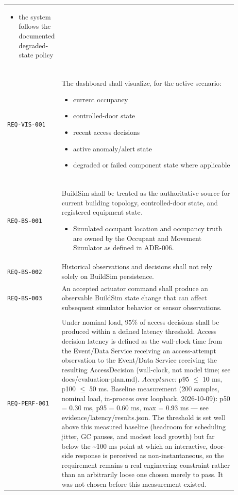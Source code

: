 \documentclass[11pt]{article}
\providecommand{\tightlist}{\setlength{\itemsep}{0pt}\setlength{\parskip}{0pt}}
\begin{document}
\begin{longtable}[]{@{}
>{\raggedright\arraybackslash}p{0.18\linewidth}
>{\raggedright\arraybackslash}p{0.76\linewidth}@{}}
\begin{itemize}
\item the system follows the documented degraded-state policy
\end{itemize} \\
\addlinespace[3pt]
\multicolumn{2}{@{}l}{\textbf{Visualization requirements}} \\[2pt]
\texttt{REQ-VIS-001} & The dashboard shall visualize, for the active scenario:
\begin{itemize}\tightlist
\item current occupancy
\item controlled-door state
\item recent access decisions
\item active anomaly/alert state
\item degraded or failed component state where applicable
\end{itemize} \\
\addlinespace[3pt]
\multicolumn{2}{@{}l}{\textbf{BuildSim integration requirements}} \\[2pt]
\texttt{REQ-BS-001} & BuildSim shall be treated as the authoritative source for current building topology, controlled-door state, and registered equipment state.
\begin{itemize}\tightlist
\item Simulated occupant location and occupancy truth are owned by the Occupant and Movement Simulator as defined in ADR-006.
\end{itemize} \\
\addlinespace[3pt]
\texttt{REQ-BS-002} & Historical observations and decisions shall not rely solely on BuildSim persistence. \\
\addlinespace[3pt]
\texttt{REQ-BS-003} & An accepted actuator command shall produce an observable BuildSim state change that can affect subsequent simulator behavior or sensor observations. \\
\addlinespace[3pt]
\multicolumn{2}{@{}l}{\textbf{Performance requirements}} \\[2pt]
\texttt{REQ-PERF-001} & Under nominal load, 95\% of access decisions shall be produced within a defined latency threshold.
Access decision latency is defined as the wall-clock time from the Event/Data Service receiving an access-attempt observation to the Event/Data Service receiving the resulting AccessDecision (wall-clock, not model time; see docs/evaluation-plan.md).
\textit{Acceptance:}
p95 $\leq$ 10 ms, p100 $\leq$ 50 ms. Baseline measurement (200 samples, nominal load, in-process over loopback, 2026-10-09): p50 = 0.30 ms, p95 = 0.60 ms, max = 0.93 ms — see evidence/latency/results.json. The threshold is set well above this measured baseline (headroom for scheduling jitter, GC pauses, and modest load growth) but far below the \textasciitilde{}100 ms point at which an interactive, door-side response is perceived as non-instantaneous, so the requirement remains a real engineering constraint rather than an arbitrarily loose one chosen merely to pass. It was not chosen before this measurement existed. \\

\end{longtable}
\end{document}
